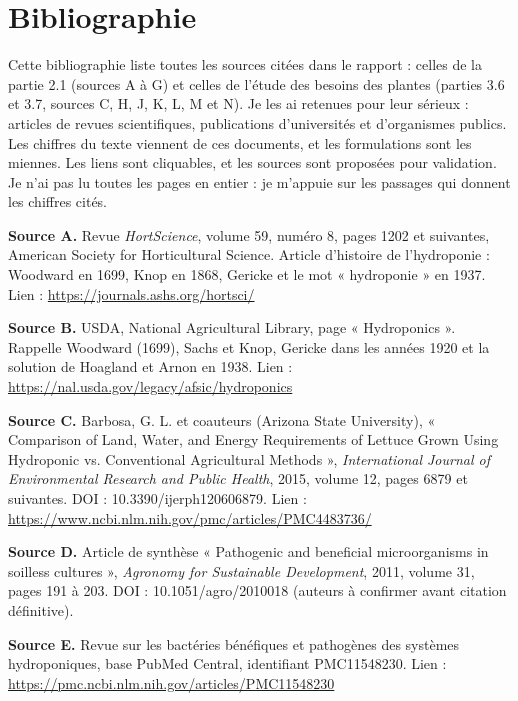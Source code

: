 \clearpage{}\section*{Bibliographie}

Cette bibliographie liste toutes les sources citées dans le rapport : celles de la partie 2.1 (sources A à G) et celles de l'étude des besoins des plantes (parties 3.6 et 3.7, sources C, H, J, K, L, M et N). Je les ai retenues pour leur sérieux : articles de revues scientifiques, publications d'universités et d'organismes publics. Les chiffres du texte viennent de ces documents, et les formulations sont les miennes. Les liens sont cliquables, et les sources sont proposées pour validation. Je n'ai pas lu toutes les pages en entier : je m'appuie sur les passages qui donnent les chiffres cités.

\textbf{Source A.} Revue \emph{HortScience}, volume 59, numéro 8, pages 1202 et suivantes, American Society for Horticultural Science. Article d'histoire de l'hydroponie : Woodward en 1699, Knop en 1868, Gericke et le mot « hydroponie » en 1937. Lien : \url{https://journals.ashs.org/hortsci/}

\textbf{Source B.} USDA, National Agricultural Library, page « Hydroponics ». Rappelle Woodward (1699), Sachs et Knop, Gericke dans les années 1920 et la solution de Hoagland et Arnon en 1938. Lien : \url{https://nal.usda.gov/legacy/afsic/hydroponics}

\textbf{Source C.} Barbosa, G. L. et coauteurs (Arizona State University), « Comparison of Land, Water, and Energy Requirements of Lettuce Grown Using Hydroponic vs. Conventional Agricultural Methods », \emph{International Journal of Environmental Research and Public Health}, 2015, volume 12, pages 6879 et suivantes. DOI : 10.3390/ijerph120606879. Lien : \url{https://www.ncbi.nlm.nih.gov/pmc/articles/PMC4483736/}

\textbf{Source D.} Article de synthèse « Pathogenic and beneficial microorganisms in soilless cultures », \emph{Agronomy for Sustainable Development}, 2011, volume 31, pages 191 à 203. DOI : 10.1051/agro/2010018 (auteurs à confirmer avant citation définitive).

\textbf{Source E.} Revue sur les bactéries bénéfiques et pathogènes des systèmes hydroponiques, base PubMed Central, identifiant PMC11548230. Lien : \url{https://pmc.ncbi.nlm.nih.gov/articles/PMC11548230}

